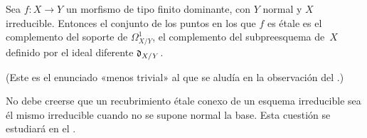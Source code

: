 \begin{corollaire}
\label{I.9.12}
Sea $f\colon X\to Y$ un morfismo de tipo finito dominante, con $Y$ normal y $X$ irreducible. Entonces el conjunto de los puntos en los que $f$ es étale es el complemento del soporte de $\Omega^1_{X/Y}$, \ie el complemento del subpreesquema de~$X$ definido por el ideal diferente $\mathfrak{d}_{X/Y}$.
\end{corollaire}

(Este
es el enunciado «menos trivial» al que se aludía en la observación del \No{}.)

\begin{remarquestar}
No debe creerse que un recubrimiento étale conexo de un esquema irreducible sea él mismo irreducible cuando no se supone normal la base. Esta cuestión se estudiará en el \No{}.
\end{remarquestar}
